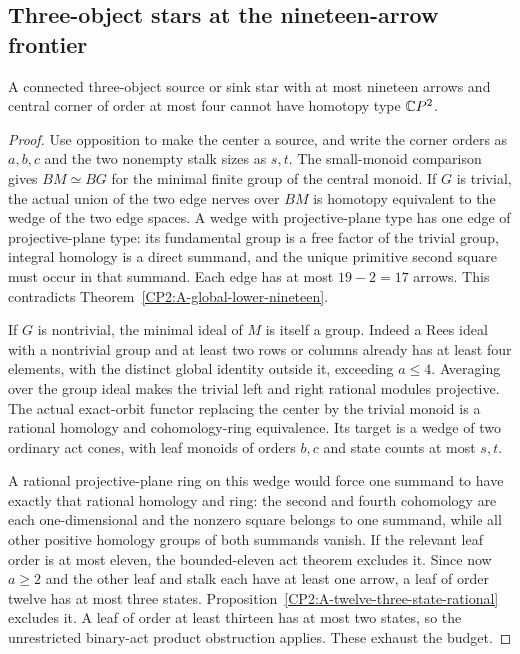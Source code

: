 \subsection{Three-object stars at the nineteen-arrow frontier}

\begin{proposition}
\label{CP2:A-star-small-center-nineteen}
A connected three-object source or sink star with at most nineteen
arrows and central corner of order at most four cannot have homotopy
type $\mathbb{C}P^2$.
\end{proposition}
\begin{proof}
Use opposition to make the center a source, and write the corner
orders as $a,b,c$ and the two nonempty stalk sizes as $s,t$.
The small-monoid comparison gives $BM\simeq BG$ for the minimal
finite group of the central monoid. If $G$ is trivial, the actual
union of the two edge nerves over $BM$ is homotopy equivalent to
the wedge of the two edge spaces. A wedge with projective-plane
type has one edge of projective-plane type: its fundamental group
is a free factor of the trivial group, integral homology is a direct
summand, and the unique primitive second square must occur in that
summand. Each edge has at most $19-2=17$ arrows. This contradicts
Theorem~\ref{CP2:A-global-lower-nineteen}.

If $G$ is nontrivial, the minimal ideal of $M$ is itself a group.
Indeed a Rees ideal with a nontrivial group and at least two rows
or columns already has at least four elements, with the distinct
global identity outside it, exceeding $a\le4$. Averaging over the
group ideal makes the trivial left and right rational modules
projective. The actual exact-orbit functor replacing the center by
the trivial monoid is a rational homology and cohomology-ring
equivalence. Its target is a wedge of two ordinary act cones, with
leaf monoids of orders $b,c$ and state counts at most $s,t$.

A rational projective-plane ring on this wedge would force one
summand to have exactly that rational homology and ring: the
second and fourth cohomology are each one-dimensional and the
nonzero square belongs to one summand, while all other positive
homology groups of both summands vanish. If the relevant leaf
order is at most eleven, the bounded-eleven act theorem excludes
it. Since now $a\ge2$ and the other leaf and stalk each have at
least one arrow, a leaf of order twelve has at most three states.
Proposition~\ref{CP2:A-twelve-three-state-rational} excludes it.
A leaf of order at least thirteen has at most two states, so the
unrestricted binary-act product obstruction applies. These exhaust
the budget.
\end{proof}

